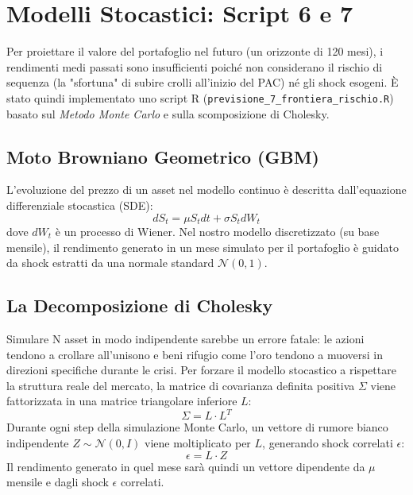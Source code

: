 \chapter{Modelli Stocastici: Script 6 e 7}

Per proiettare il valore del portafoglio nel futuro (un orizzonte di 120 mesi), i rendimenti medi passati sono insufficienti poiché non considerano il rischio di sequenza (la "sfortuna" di subire crolli all'inizio del PAC) né gli shock esogeni. \`E stato quindi implementato uno script R (\texttt{previsione\_7\_frontiera\_rischio.R}) basato sul \emph{Metodo Monte Carlo} e sulla scomposizione di Cholesky.

\section{Moto Browniano Geometrico (GBM)}
L'evoluzione del prezzo di un asset nel modello continuo \`e descritta dall'equazione differenziale stocastica (SDE):
\begin{equation}
dS_t = \mu S_t dt + \sigma S_t dW_t
\end{equation}
dove $dW_t$ è un processo di Wiener. Nel nostro modello discretizzato (su base mensile), il rendimento generato in un mese simulato per il portafoglio \`e guidato da shock estratti da una normale standard $\mathcal{N}(0,1)$.

\section{La Decomposizione di Cholesky}
Simulare N asset in modo indipendente sarebbe un errore fatale: le azioni tendono a crollare all'unisono e beni rifugio come l'oro tendono a muoversi in direzioni specifiche durante le crisi. Per forzare il modello stocastico a rispettare la struttura reale del mercato, la matrice di covarianza definita positiva $\Sigma$ viene fattorizzata in una matrice triangolare inferiore $L$:
\begin{equation}
\Sigma = L \cdot L^T
\end{equation}
Durante ogni step della simulazione Monte Carlo, un vettore di rumore bianco indipendente $Z \sim \mathcal{N}(0, I)$ viene moltiplicato per $L$, generando shock correlati $\epsilon$:
\begin{equation}
\epsilon = L \cdot Z
\end{equation}
Il rendimento generato in quel mese sar\`a quindi un vettore dipendente da $\mu$ mensile e dagli shock $\epsilon$ correlati.

